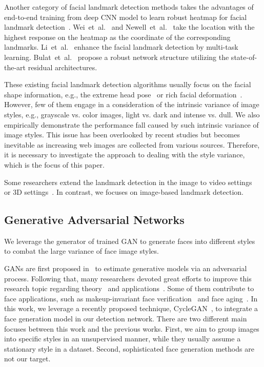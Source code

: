 \documentclass[10pt,twocolumn,letterpaper]{article}
\begin{document}
Another category of facial landmark detection methods takes the advantages of end-to-end training from deep CNN model to learn robust heatmap for facial landmark detection~\cite{li2016face,wei2016convolutional,bulat2017far,bulat2016convolutional}.
Wei~et~al.~\cite{li2016face} and Newell~et~al.~\cite{newell2016stacked} take the location with the highest response on the heatmap as the coordinate of the corresponding landmarks.
Li~et~al.~\cite{li2016face} enhance the facial landmark detection by multi-task learning.
Bulat~et~al.~\cite{bulat2017far} propose a robust network structure utilizing the state-of-the-art residual architectures.


These existing facial landmark detection algorithms usually focus on the facial shape information, e.g., the extreme head pose~\cite{jourabloo2017pose} or rich facial deformation~\cite{zhu2016unconstrained}.
However, few of them engage in a consideration of the intrinsic variance of image styles, e.g., grayscale vs. color images, light vs. dark and intense vs. dull.
We also empirically demonstrate the performance fall caused by such intrinsic variance of image styles.
This issue has been overlooked by recent studies but becomes inevitable as increasing web images are collected from various sources.
Therefore, it is necessary to investigate the approach to dealing with the style variance, which is the focus of this paper.


Some researchers extend the landmark detection in the image to video settings~\cite{khan2017synergy,dong2018sbr,peng2016recurrent} or 3D settings~\cite{bulat2017far,simon2017kronecker}.
In contrast, we focuses on image-based landmark detection.

\subsection{Generative Adversarial Networks}

We leverage the generator of trained GAN to generate faces into different styles to combat the large variance of face image styles.

GANs are first proposed in~\cite{goodfellow2014generative} to estimate generative models via an adversarial process.
Following that, many researchers devoted great efforts to improve this research topic regarding theory~\cite{arjovsky2017wasserstein,chen2016infogan,li2017dualing,nowozin2016f,tolstikhin2017adagan} and applications~\cite{osokin2017gans,radford2015unsupervised,sixt2016rendergan,CycleGAN2017}.
Some of them contribute to face applications, such as makeup-invariant face verification~\cite{li2017anti} and face aging~\cite{antipov2017face}.
In this work, we leverage a recently proposed technique, CycleGAN~\cite{CycleGAN2017}, to integrate a face generation model in our detection network.
There are two different main focuses between this work and the previous works.
First, we aim to group images into specific styles in an unsupervised manner, while they usually assume a stationary style in a dataset.
Second, sophisticated face generation methods are not our target.
\end{document}
